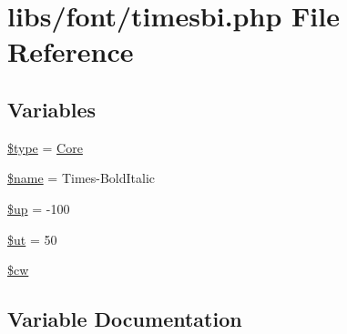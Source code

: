 \hypertarget{timesbi_8php}{}\section{libs/font/timesbi.php File Reference}
\label{timesbi_8php}
\subsection*{Variables}
\begin{DoxyCompactItemize}
\item 
\hyperlink{timesbi_8php_a9a4a6fba2208984cabb3afacadf33919}{\$type} = \textquotesingle{}\hyperlink{class_core}{Core}\textquotesingle{}
\item 
\hyperlink{timesbi_8php_ab2fc40d43824ea3e1ce5d86dee0d763b}{\$name} = \textquotesingle{}Times-\/Bold\+Italic\textquotesingle{}
\item 
\hyperlink{timesbi_8php_a6b5ad2ac55f9df46e8f34e78fbd6f176}{\$up} = -\/100
\item 
\hyperlink{timesbi_8php_aadd3f841051043ee58e587e840e8dd0b}{\$ut} = 50
\item 
\hyperlink{timesbi_8php_ac2951b03dbb0317e6c61ec920b7479dc}{\$cw}
\end{DoxyCompactItemize}


\subsection{Variable Documentation}
\hypertarget{timesbi_8php_ac2951b03dbb0317e6c61ec920b7479dc}{}
